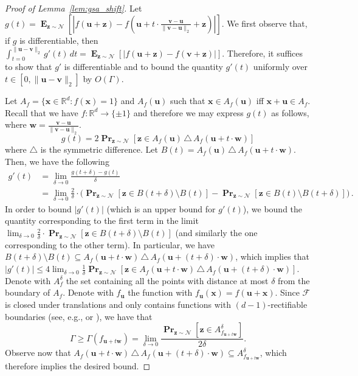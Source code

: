 \documentclass{theoretics}
\renewcommand\vec[1]{\mathbf{#1}}
\DeclareMathOperator*{\pr}{\mathbf{Pr}}
\DeclareMathOperator*{\E}{\mathbf{E}}
\newcommand{\R}{\mathbb{R}}
\newcommand{\1}{\Ind}
\newcommand{\x}{\vec x}
\renewcommand{\vv}{\vec v}
\newcommand{\vu}{\vec u}
\newcommand{\vw}{\vec w}
\newcommand{\z}{\vec z}
\newcommand{\F}{\mathcal{F}}
\newcommand{\Gauss}{\mathcal{N}}
\begin{document}
\begin{proof}[Proof of Lemma~\ref{lem:gsa_shift}]
\label{proof:gsa_shift}
    Let $g(t) = \E_{\z\sim\Gauss}[|f(\vu+\z)-f(\vu+t\cdot\frac{\vv-\vu}{\|\vv-\vu\|_2}+\z)|]$. We first observe that, if $g$ is differentiable, then $\int_{t=0}^{\|\vu-\vv\|_2} g'(t) \, dt = \E_{\z\sim\Gauss}[|f(\vu+\z)-f(\vv+\z)|]$. Therefore, it suffices to show that $g'$ is differentiable and to bound the quantity $g'(t)$ uniformly over $t\in[0,\|\vu-\vv\|_2]$ by $O(\Gamma)$. 

    Let $A_f = \{\x\in\R^d: f(\x)=1\}$ and $A_f(\vu)$ such that $\x\in A_f(\vu)$ iff $\x+\vu\in A_f$. Recall that we have $f:\R^d\to\{\pm 1\}$ and therefore we may express $g(t)$ as follows, where $\vec w = \frac{\vv-\vu}{\|\vv-\vu\|_2}$.
    \[
        g(t) = 2\pr_{\z\sim\Gauss}[\z\in A_f(\vu)\,\triangle\, A_f(\vu+t\cdot \vec w)] 
    \] where $\triangle$ is the symmetric difference.
    Let $B(t) = A_f(\vu)\,\triangle\, A_f(\vu+t\cdot \vec w)$. Then, we have the following
    \begin{align*}
        g'(t) &= \lim_{\delta\to0} \frac{g(t+\delta)-g(t)}{\delta}\\
        &=\lim_{\delta\to0} \frac{2}{\delta}\cdot \Bigr( \pr_{\z\sim\Gauss}[\z\in B(t+\delta)\setminus B(t)] - \pr_{\z\sim\Gauss}[\z\in B(t)\setminus B(t+\delta)] \Bigr)\,.
    \end{align*}
    In order to bound $|g'(t)|$ (which is an upper bound for $g'(t)$), we bound the quantity corresponding to the first term in the limit $\lim_{\delta\to0} \frac{2}{\delta}\cdot \pr_{\z\sim\Gauss}[\z\in B(t+\delta)\setminus B(t)]$ (and similarly the one corresponding to the other term). In particular, we have $B(t+\delta)\setminus B(t)\subseteq A_f(\vu+t\cdot \vec w)\,\triangle\, A_f(\vu+(t+\delta)\cdot \vec w)$, which implies that $|g'(t)| \le 4\lim_{\delta\to0} \frac{1}{\delta}\pr_{\z\sim \Gauss}[\z\in A_f(\vu+t\cdot \vec w)\,\triangle\, A_f(\vu+(t+\delta)\cdot \vec w)]$. Denote with $A_f^\delta$ the set containing all the points with distance at most $\delta$ from the boundary of $A_f$. Denote with $f_{\vu}$ the function with $f_{\vu}(\x) = f(\vu+\x)$. Since $\F$ is closed under translations and only contains functions with $(d-1)$-rectifiable boundaries (see, e.g., \cite{federer1969geometric} or \cite[Proposition A.3]{Kane11}), we have that 
    \[
        \Gamma\ge \Gamma(f_{\vu+t\vw}) = \lim_{\delta\to 0}\frac{\pr_{\z\sim\Gauss}[\z\in A_{f_{\vu+t\vw}}^\delta]}{2\delta}.
    \]
    Observe now that $A_f(\vu+t\cdot \vec w)\,\triangle\, A_f(\vu+(t+\delta)\cdot \vec w) \subseteq A_{f_{\vu+t\vw}}^\delta$, which therefore implies the desired bound.
\end{proof}
\end{document}
